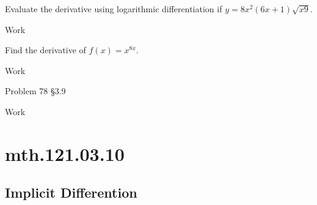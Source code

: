 \documentclass[12pt,addpoints, answers, fleqn]{exam}
\begin{document}
\begin{teacher}
\begin{questions}
\question 	%

Evaluate the derivative using logarithmic differentiation if $y = 8x^2 \left(6x + 1\right)\sqrt{x  9}$.
\begin{solution}
Work
\end{solution}

\question 	%

Find the derivative of $f\left(x\right) = x^{8x}$.
\begin{solution}
Work
\end{solution}

\question 	%

Problem 78 \S3.9
\begin{solution}
Work
\end{solution}

\end{questions}
\end{teacher}
\vfill
\pagebreak

\section{mth.121.03.10}
\subsection{Implicit Differention}
\end{document}
